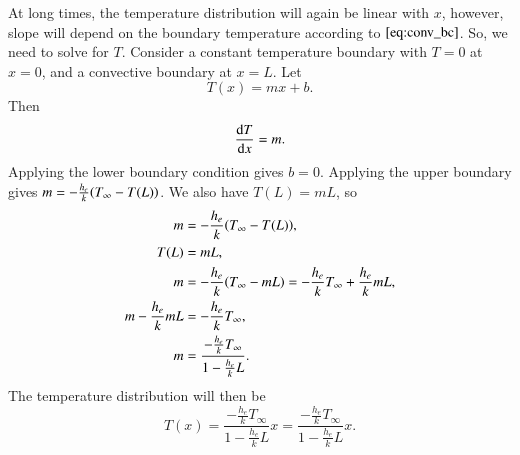 \documentclass[letterpaper,12pt]{article}
\begin{document}
At long times, the temperature distribution will again be linear with $x$, however, slope will depend on the boundary temperature
according to $\ref{eq:conv_bc}$. So, we need to solve for $T$. Consider a constant temperature boundary with $T = 0$ at $x = 0$, and a convective
boundary at $x = L$. Let
\begin{equation}
  T(x) = mx + b.
\end{equation}
Then
\begin{equation}
  \dv{T}{x} = m.
\end{equation}
Applying the lower boundary condition gives $b = 0$. Applying the upper boundary gives $m = -\frac{h_e}{k}\qty(T_\infty - T(L))$. We also have
$T(L) = mL$, so
\begin{align}
  m &= -\frac{h_e}{k}\qty(T_\infty - T(L)), \\
  T(L) &= mL,\\
  m &= -\frac{h_e}{k}\qty(T_\infty - mL) = -\frac{h_e}{k}T_\infty + \frac{h_e}{k} mL, \\
  m - \frac{h_e}{k} mL  &= -\frac{h_e}{k}T_\infty , \\
  m &= \frac{ -\frac{h_e}{k}T_\infty }{1 - \frac{h_e}{k} L}.
\end{align}
The temperature distribution will then be
\begin{equation}
  T(x) = \frac{ -\frac{h_e}{k}T_\infty }{1 - \frac{h_e}{k} L} x 
  = \frac{ -\frac{h_e}{k}T_\infty }{1 - \frac{h_e}{k} L} x .
\end{equation}
\end{document}
